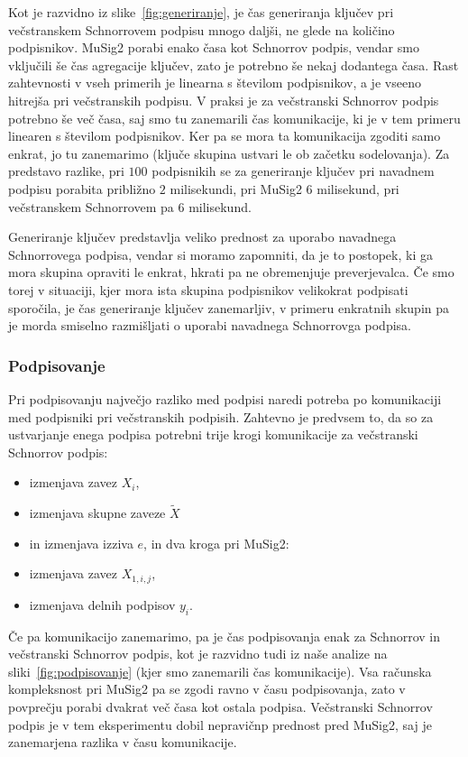 \documentclass[isrm2, tisk]{fmfdelo}
\begin{document}
Kot je razvidno iz slike~\ref{fig:generiranje}, je čas generiranja ključev pri večstranskem Schnorrovem
podpisu mnogo daljši, ne glede na količino podpisnikov. MuSig2 porabi enako časa kot Schnorrov podpis,
vendar smo vključili še čas agregacije ključev, zato je potrebno še nekaj dodantega časa. Rast
zahtevnosti v vseh primerih je linearna s številom podpisnikov, a je vseeno hitrejša pri večstranskih
podpisu. V praksi je za večstranski Schnorrov podpis potrebno še več časa, saj smo tu zanemarili čas
komunikacije, ki je v tem primeru linearen s številom podpisnikov. Ker pa se mora ta komunikacija
zgoditi samo enkrat, jo tu zanemarimo (ključe skupina ustvari le ob začetku sodelovanja). Za predstavo
razlike, pri $100$ podpisnikih se za generiranje ključev pri navadnem podpisu porabita približno $2$
milisekundi, pri MuSig2 $6$ milisekund, pri večstranskem Schnorrovem pa $6$ milisekund.

Generiranje ključev predstavlja veliko prednost za uporabo navadnega Schnorrovega podpisa, vendar
si moramo zapomniti, da je to postopek, ki ga mora skupina opraviti le enkrat, hkrati pa ne obremenjuje
preverjevalca. Če smo torej v situaciji, kjer mora ista skupina podpisnikov velikokrat podpisati
sporočila, je čas generiranje ključev zanemarljiv, v primeru enkratnih skupin pa je morda smiselno
razmišljati o uporabi navadnega Schnorrovga podpisa.

\subsubsection{Podpisovanje}
Pri podpisovanju največjo razliko med podpisi naredi potreba po komunikaciji med podpisniki pri
večstranskih podpisih. Zahtevno je predvsem to, da so za ustvarjanje enega podpisa potrebni trije
krogi komunikacije za večstranski Schnorrov podpis:
\begin{itemize}
    \item izmenjava zavez $X_i$,
    \item izmenjava skupne zaveze $\tilde{X}$
    \item in izmenjava izziva $e$,
in dva kroga pri MuSig2:
    \item izmenjava zavez $X_{1, i, j}$,
    \item izmenjava delnih podpisov $y_i$.
\end{itemize}
Če pa komunikacijo zanemarimo, pa je čas podpisovanja enak za Schnorrov in večstranski Schnorrov podpis,
kot je razvidno tudi iz naše analize na sliki~\ref{fig:podpisovanje} (kjer smo zanemarili čas
komunikacije). Vsa računska kompleksnost pri MuSig2 pa se zgodi ravno v času podpisovanja, zato v
povprečju porabi dvakrat več časa kot ostala podpisa. Večstranski Schnorrov podpis je v tem eksperimentu
dobil nepravičnp prednost pred MuSig2, saj je zanemarjena razlika v času komunikacije.
\end{document}
